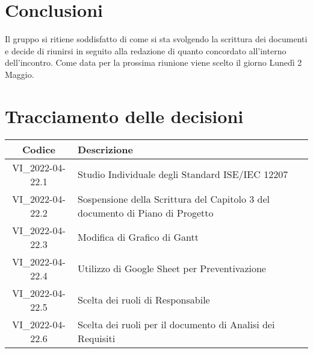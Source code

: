 \section{Conclusioni}
	Il gruppo si ritiene soddisfatto di come si sta svolgendo la scrittura dei documenti e decide di riunirsi in seguito alla redazione di quanto concordato all'interno dell'incontro. Come data per la prossima riunione viene scelto il giorno Lunedì 2 Maggio.
\newpage

\section*{Tracciamento delle decisioni}
	\renewcommand{\arraystretch}{1.8} %
	\begin{tabular}{ |c|l| }
		\hline
		\textbf{Codice} & \textbf{Descrizione} \\
		\hline
		VI\_2022-04-22.1 & Studio Individuale degli Standard ISE/IEC 12207\\ 
		\hline
		VI\_2022-04-22.2 & Sospensione della Scrittura del Capitolo 3 del documento di Piano di Progetto \\ 
		\hline
		VI\_2022-04-22.3 & Modifica di Grafico di Gantt\\ 
		\hline
		VI\_2022-04-22.4 & Utilizzo di Google Sheet per Preventivazione\\ 
		\hline
		VI\_2022-04-22.5 & Scelta dei ruoli di Responsabile\\ 
		\hline
		VI\_2022-04-22.6 & Scelta dei ruoli per il documento di Analisi dei Requisiti\\ 
		\hline
	\end{tabular}